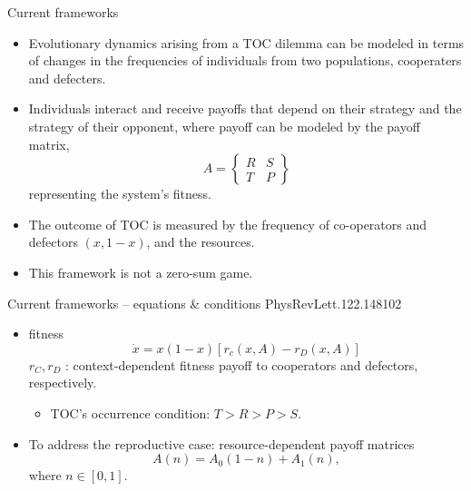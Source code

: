 \documentclass{beamer}
\begin{document}
\begin{frame}{Current frameworks}
    \begin{itemize}
        \item Evolutionary dynamics arising from a TOC dilemma can be modeled in terms of changes in the frequencies of individuals from two populations, cooperaters and defecters. 
        \item  Individuals interact and receive payoffs that depend on their strategy and the strategy of their opponent, where payoff can be modeled by the payoff matrix,$$A = \begin{Bmatrix}
            R &S \\T &P
        \end{Bmatrix}$$ representing the system's fitness.
        \item The outcome of TOC is measured by the frequency of co-operators and defectors $(x, 1-x)$, and the resources.
        \item This framework is not a zero-sum game.
    \end{itemize}
\end{frame}

\begin{frame}{Current frameworks -- equations \& conditions \small{PhysRevLett.122.148102}}
    \begin{itemize}
        \item fitness \begin{equation}
            \dot{x} = x(1-x)[r_c(x,A)-r_D(x,A)]
        \end{equation}
        $r_C,r_D$ : context-dependent fitness
        payoff to cooperators and defectors, respectively.
        
        \begin{itemize}
            \item TOC's occurrence condition: $T>R>P>S$.
        \end{itemize}
        \item To address the reproductive case: resource-dependent payoff matrices $$A(n)=A_0(1-n)+A_1(n),$$ where $n\in[0,1].$

    \end{itemize}
\end{frame}
\end{document}

